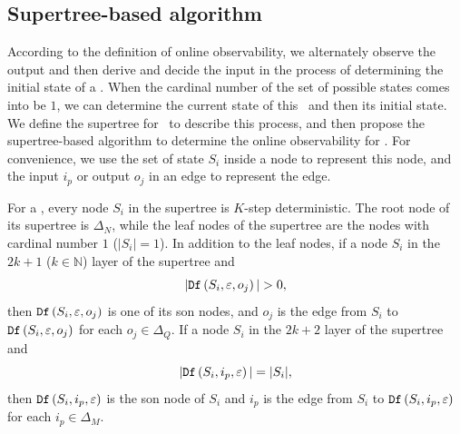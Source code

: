 \subsection{Supertree-based algorithm} %
According to the definition of online observability, we alternately observe the output and then derive and decide the input in the process of determining the initial state of a \BCN. When the  cardinal number of the set of possible states comes into be $1$, we can determine the current state of this \BCN\ and then its initial state. We define the supertree for \BCNs\ to describe this process, and then propose the supertree-based algorithm to determine the online observability for \BCNs. For convenience, we use the set of state $S_i$ inside a node to represent this node, and the input $i_p$ or output $o_j$ in an edge to represent the edge.
\begin{definition}[Supertree]
For a \BCN, every node $S_i$ in the supertree is $K$-step deterministic. The root node of its supertree is $\Delta_N$, while the leaf nodes of the supertree are the nodes with cardinal number $1$ ($|S_i|=1$). In addition to the leaf nodes, if a node $S_i$ in the $2k + 1$ ($k\in \mathbb{N}$) layer of the supertree and 
\[|\Ded\left(S_i,\varepsilon, o_j\right)|>0,\]
 then ${\tt Df}\left(S_i,\varepsilon, o_j\right)$ is one of its son nodes, and $o_j$ is the edge from $S_i$ to ${\tt Df}\left(S_i,\varepsilon, o_j\right)$ for each $o_j \in \Delta_Q$. If a node $S_i$ in the $2k+2$ layer of the supertree and  
\[|{\tt Df}\left(S_i,i_p,\varepsilon\right)|=|S_i|,\] 
then ${\tt Df}\left(S_i,i_p,\varepsilon\right)$ is the son node of $S_i$ and $i_p$ is the edge from $S_i$ to ${\tt Df}\left(S_i,i_p,\varepsilon\right)$ for each $i_p \in \Delta_M$. 
\label{def:super-tree}
\end{definition}

